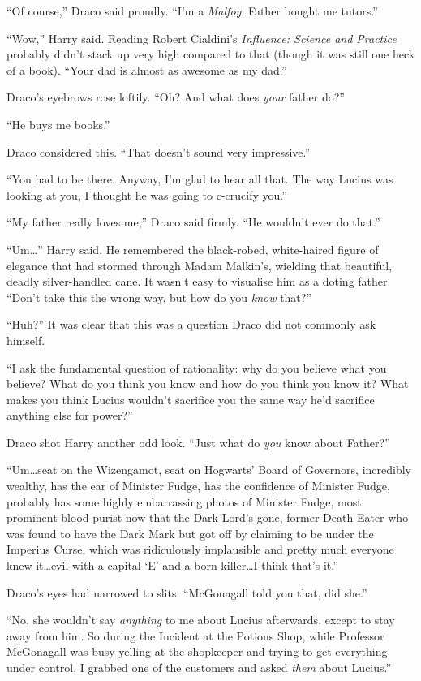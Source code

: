 “Of course,” Draco said proudly. “I’m a \emph{Malfoy}. Father bought me tutors.”

“Wow,” Harry said. Reading Robert Cialdini’s \emph{Influence: Science and Practice} probably didn’t stack up very high compared to that (though it was still one heck of a book). “Your dad is almost as awesome as my dad.”

Draco’s eyebrows rose loftily. “Oh? And what does \emph{your} father do?”

“He buys me books.”

Draco considered this. “That doesn’t sound very impressive.”

“You had to be there. Anyway, I’m glad to hear all that. The way Lucius was looking at you, I thought he was going to c-crucify you.”

“My father really loves me,” Draco said firmly. “He wouldn’t ever do that.”

“Um…” Harry said. He remembered the black-robed, white-haired figure of elegance that had stormed through Madam Malkin’s, wielding that beautiful, deadly silver-handled cane. It wasn’t easy to visualise him as a doting father. “Don’t take this the wrong way, but how do you \emph{know} that?”

“Huh?” It was clear that this was a question Draco did not commonly ask himself.

“I ask the fundamental question of rationality: why do you believe what you believe? What do you think you know and how do you think you know it? What makes you think Lucius wouldn’t sacrifice you the same way he’d sacrifice anything else for power?”

Draco shot Harry another odd look. “Just what do \emph{you} know about Father?”

“Um…seat on the Wizengamot, seat on Hogwarts’ Board of Governors, incredibly wealthy, has the ear of Minister Fudge, has the confidence of Minister Fudge, probably has some highly embarrassing photos of Minister Fudge, most prominent blood purist now that the Dark Lord’s gone, former Death Eater who was found to have the Dark Mark but got off by claiming to be under the Imperius Curse, which was ridiculously implausible and pretty much everyone knew it…evil with a capital ‘E’ and a born killer…I think that’s it.”

Draco’s eyes had narrowed to slits. “McGonagall told you that, did she.”

“No, she wouldn’t say \emph{anything} to me about Lucius afterwards, except to stay away from him. So during the Incident at the Potions Shop, while Professor McGonagall was busy yelling at the shopkeeper and trying to get everything under control, I grabbed one of the customers and asked \emph{them} about Lucius.”

